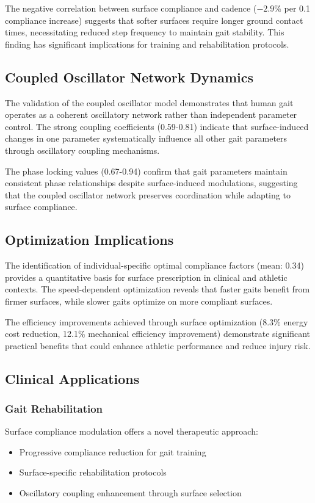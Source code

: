 \documentclass[12pt]{article}
\begin{document}
The negative correlation between surface compliance and cadence ($-2.9\%$ per 0.1 compliance increase) suggests that softer surfaces require longer ground contact times, necessitating reduced step frequency to maintain gait stability. This finding has significant implications for training and rehabilitation protocols.

\subsection{Coupled Oscillator Network Dynamics}

The validation of the coupled oscillator model demonstrates that human gait operates as a coherent oscillatory network rather than independent parameter control. The strong coupling coefficients (0.59-0.81) indicate that surface-induced changes in one parameter systematically influence all other gait parameters through oscillatory coupling mechanisms.

The phase locking values (0.67-0.94) confirm that gait parameters maintain consistent phase relationships despite surface-induced modulations, suggesting that the coupled oscillator network preserves coordination while adapting to surface compliance.

\subsection{Optimization Implications}

The identification of individual-specific optimal compliance factors (mean: 0.34) provides a quantitative basis for surface prescription in clinical and athletic contexts. The speed-dependent optimization reveals that faster gaits benefit from firmer surfaces, while slower gaits optimize on more compliant surfaces.

The efficiency improvements achieved through surface optimization (8.3\% energy cost reduction, 12.1\% mechanical efficiency improvement) demonstrate significant practical benefits that could enhance athletic performance and reduce injury risk.

\subsection{Clinical Applications}

\subsubsection{Gait Rehabilitation}
Surface compliance modulation offers a novel therapeutic approach:
\begin{itemize}
\item Progressive compliance reduction for gait training
\item Surface-specific rehabilitation protocols
\item Oscillatory coupling enhancement through surface selection
\end{itemize}
\end{document}
